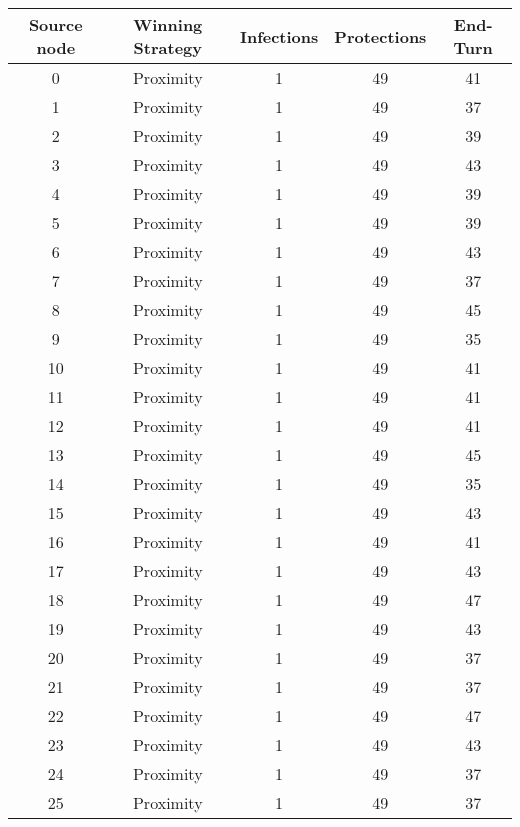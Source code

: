 \documentclass[results.tex]{subfiles}
\begin{document}
\begin{center}
  \begin{tabular}{| c || c | c | c | c |}
    \hline
    {\bfseries Source node} & {\bfseries Winning Strategy} & {\bfseries Infections} & {\bfseries Protections} & {\bfseries End-Turn} \\  %
    \hline\hline
    0 & Proximity & 1 & 49 & 41 \\ 
    \hline
    1 & Proximity & 1 & 49 & 37 \\ 
    \hline
    2 & Proximity & 1 & 49 & 39 \\ 
    \hline
    3 & Proximity & 1 & 49 & 43 \\ 
    \hline
    4 & Proximity & 1 & 49 & 39 \\ 
    \hline
    5 & Proximity & 1 & 49 & 39 \\ 
    \hline
    6 & Proximity & 1 & 49 & 43 \\ 
    \hline
    7 & Proximity & 1 & 49 & 37 \\ 
    \hline
    8 & Proximity & 1 & 49 & 45 \\ 
    \hline
    9 & Proximity & 1 & 49 & 35 \\ 
    \hline
    10 & Proximity & 1 & 49 & 41 \\ 
    \hline
    11 & Proximity & 1 & 49 & 41 \\ 
    \hline
    12 & Proximity & 1 & 49 & 41 \\ 
    \hline
    13 & Proximity & 1 & 49 & 45 \\ 
    \hline
    14 & Proximity & 1 & 49 & 35 \\ 
    \hline
    15 & Proximity & 1 & 49 & 43 \\ 
    \hline
    16 & Proximity & 1 & 49 & 41 \\ 
    \hline
    17 & Proximity & 1 & 49 & 43 \\ 
    \hline
    18 & Proximity & 1 & 49 & 47 \\ 
    \hline
    19 & Proximity & 1 & 49 & 43 \\ 
    \hline
    20 & Proximity & 1 & 49 & 37 \\ 
    \hline
    21 & Proximity & 1 & 49 & 37 \\ 
    \hline
    22 & Proximity & 1 & 49 & 47 \\ 
    \hline
    23 & Proximity & 1 & 49 & 43 \\ 
    \hline
    24 & Proximity & 1 & 49 & 37 \\ 
    \hline
    25 & Proximity & 1 & 49 & 37 \\ 

\end{tabular}
\end{center}
\end{document}

